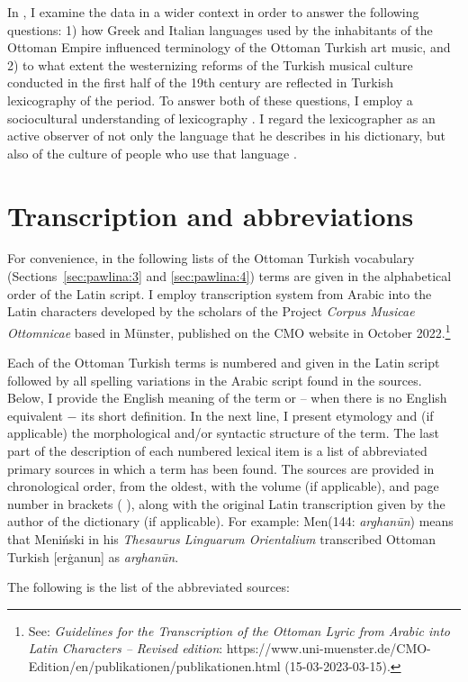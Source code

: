 \documentclass[output=paper,colorlinks,citecolor=brown,arabicfont,chinesefont]{langscibook}
\begin{document}
In , I examine the data in a wider context in order to answer the following questions: 1) how Greek and Italian languages used by the inhabitants of the Ottoman Empire influenced terminology of the Ottoman Turkish art music, and 2) to what extent the westernizing reforms of the Turkish musical culture conducted in the first half of the 19th century are reflected in Turkish lexicography of the period. To answer both of these questions, I employ a sociocultural understanding of lexicography \parencites[37]{Doroszewski1970}{Hausmann1989}. I regard the lexicographer as an active observer of not only the language that he describes in his dictionary, but also of the culture of people who use that language \citep{Ligara2017}.
\section{Transcription and abbreviations}
For convenience, in the following lists of the Ottoman Turkish vocabulary (Sections~\ref{sec:pawlina:3} and \ref{sec:pawlina:4}) terms are given in the alphabetical order of the Latin script. I employ transcription system from Arabic into the Latin characters developed by the scholars of the Project \emph{Corpus Musicae Ottomnicae} based in Münster, published on the CMO website in October 2022.\footnote{See: \emph{Guidelines for the Transcription of the Ottoman Lyric from Arabic into Latin Characters – Revised edition}: https://www.uni-muenster.de/CMO-Edition/en/publikationen/publikationen.html (15-03-2023-03-15).}

Each of the Ottoman Turkish terms is numbered and given in the Latin script followed by all spelling variations in the Arabic script found in the sources. Below, I provide the English meaning of the term or – when there is no English equivalent − its short definition. In the next line, I present etymology and (if applicable) the morphological and/or syntactic structure of the term. The last part of the description of each numbered lexical item is a list of abbreviated primary sources in which a term has been found. The sources are provided in chronological order, from the oldest, with the volume (if applicable), and page number in brackets (  ), along with the original Latin transcription given by the author of the dictionary (if applicable). For example: Men(144: \emph{arghanūn}) means that Meniński in his \emph{Thesaurus Linguarum Orientalium} transcribed Ottoman Turkish {} [erġanun] as \emph{arghanūn}.

The following is the list of the abbreviated sources:
\end{document}
